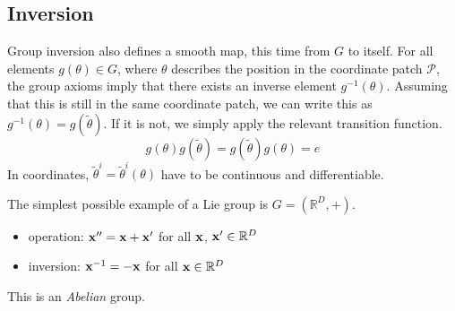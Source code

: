\subsection{Inversion}%
\label{sub:inversion}

Group inversion also defines a smooth map, this time from $G$ to itself.
For all elements $g(\theta) \in G$, where $\theta$ describes the position in the coordinate patch $\mathcal{P}$, the group axioms imply that there exists an inverse element $g^{-1}(\theta)$. Assuming that this is still in the same coordinate patch, we can write this as $g^{-1}(\theta) = g(\widetilde \theta)$. If it is not, we simply apply the relevant transition function.
\begin{equation}
  g(\theta) g(\widetilde \theta) = g(\widetilde \theta) g(\theta) = e
\end{equation}
In coordinates, $\widetilde \theta^i = \widetilde \theta^i(\theta)$ have to be continuous and differentiable.

\begin{example}[]
  The simplest possible example of a Lie group is $G = (\mathbb{R}^D, +)$.
  \begin{itemize}
    \item operation: $\vb{x}'' = \vb{x} + \vb{x}'$ for all $\vb{x}$, $\vb{x}' \in \mathbb{R}^D$
    \item inversion: $\vb{x}^{-1} = -\vb{x}$ for all $\vb{x} \in \mathbb{R}^D$
  \end{itemize}
  This is an \emph{Abelian} group.
\end{example}
